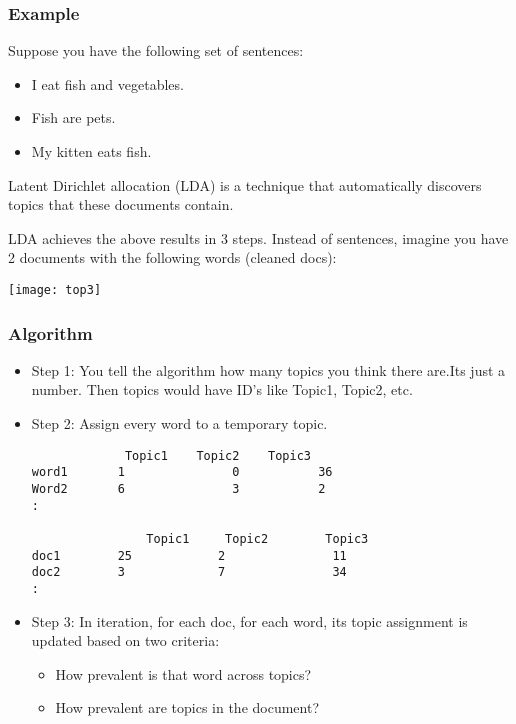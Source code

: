 \begin{frame}[fragile]\frametitle{Example}
Suppose you have the following set of sentences:
  \begin{itemize}
  	\item     I eat fish and vegetables.
  	\item         Fish are pets.
  	\item         My kitten eats fish.
  \end{itemize}
Latent Dirichlet allocation (LDA) is a technique that automatically discovers topics that these documents contain.

LDA achieves the above results in 3 steps. Instead of sentences, imagine you have 2 documents with the following words (cleaned docs):
\begin{center}
\texttt{[image: top3]}
\end{center}
\end{frame}

\begin{frame}[fragile]\frametitle{Algorithm}
  \begin{itemize}
  	\item    Step 1: You tell the algorithm how many topics you think there are.Its just a number. Then topics would have ID's like Topic1, Topic2, etc.
  	\item    Step 2: Assign every word to a temporary topic.
  	  \begin{lstlisting}
  			 Topic1    Topic2    Topic3
word1    	1       		0     		36
Word2   	6       		3      		2
:

    			Topic1     Topic2   	 Topic3
doc1		25	          2               11
doc2		3             7               34
:
\end{lstlisting}
	\item Step 3: In iteration, for each doc, for each word, its topic assignment is updated based on two criteria:
      \begin{itemize}
  	\item   How prevalent is that word across topics?
    	\item How prevalent are topics in the document?
  \end{itemize}
  \end{itemize}
\end{frame}


